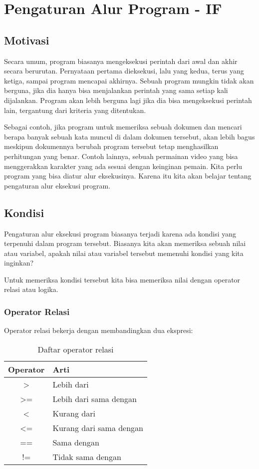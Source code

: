 \documentclass[../main.tex]{subfiles}
\begin{document}
\chapter{Pengaturan Alur Program - IF}
\section{Motivasi}
Secara umum, program biasanya mengeksekusi perintah dari awal dan akhir secara
berurutan. Pernyataan pertama dieksekusi, lalu yang kedua, terus yang ketiga,
sampai program mencapai akhirnya. Sebuah program mungkin tidak akan berguna,
jika dia hanya bisa menjalankan perintah yang sama setiap kali dijalankan.
Program akan lebih berguna lagi jika dia bisa mengeksekusi perintah lain,
tergantung dari kriteria yang ditentukan.

Sebagai contoh, jika program untuk memeriksa sebuah dokumen dan mencari berapa
banyak sebuah kata muncul di dalam dokumen tersebut, akan lebih bagus meskipun
dokumennya berubah program tersebut tetap menghasilkan perhitungan yang benar.
Contoh lainnya, sebuah permainan video yang bisa menggerakkan karakter yang ada
sesuai dengan keinginan pemain. Kita perlu program yang bisa diatur alur
eksekusinya. Karena itu kita akan belajar tentang pengaturan alur eksekusi program.

\section{Kondisi}
Pengaturan alur eksekusi program biasanya terjadi karena ada kondisi yang
terpenuhi dalam program tersebut. Biasanya kita akan memeriksa sebuah nilai
atau variabel, apakah nilai atau variabel tersebut memenuhi kondisi yang kita
inginkan?

Untuk memeriksa kondisi tersebut kita bisa memeriksa nilai dengan operator
relasi atau logika.

\subsection{Operator Relasi}
Operator relasi bekerja dengan membandingkan dua ekspresi:
\begin{table}[h!]
\centering
\begin{tabular}{@{} c l @{}}
  \toprule
  Operator  & Arti  \\
  \midrule
  >       	& Lebih dari\\
  >=     		& Lebih dari sama dengan\\
  <      		& Kurang dari\\
  <=    		& Kurang dari sama dengan\\
  ==      	& Sama dengan\\
  !=				&	Tidak sama dengan\\
  \bottomrule
\end{tabular}
\caption{Daftar operator relasi}
\label{ope-rel}
\end{table}
\end{document}
